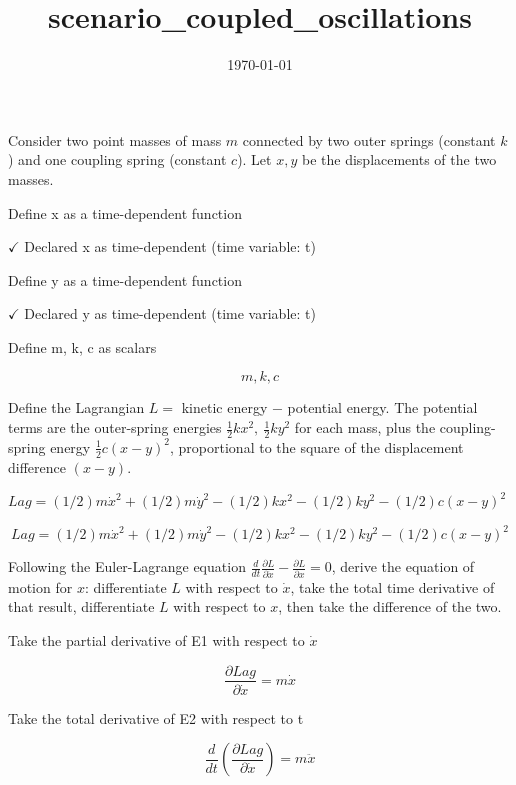 \documentclass[dvipdfmx]{article}
\title{scenario\_coupled\_oscillations}
\date{\today}
\begin{document}
\maketitle

Consider two point masses of mass $m$ connected by two outer springs (constant $k$) and one coupling spring (constant $c$). Let $x,y$ be the displacements of the two masses.

Define x as a time-dependent function

$\checkmark$ Declared x as time-dependent (time variable: t)

Define y as a time-dependent function

$\checkmark$ Declared y as time-dependent (time variable: t)

Define m, k, c as scalars

\[
  m, k, c
\]

Define the Lagrangian $L=$ kinetic energy $-$ potential energy. The potential terms are the outer-spring energies $\frac12kx^2,\ \frac12ky^2$ for each mass, plus the coupling-spring energy $\frac12c(x-y)^2$, proportional to the square of the displacement difference $(x-y)$.

$Lag = (1/2) m \dot{x}^2 + (1/2) m \dot{y}^2 - (1/2) k x^2 - (1/2) k y^2 - (1/2) c (x - y)^2$

\begin{equation}
  Lag = (1/2) m \dot{x}^2 + (1/2) m \dot{y}^2 - (1/2) k x^2 - (1/2) k y^2 - (1/2) c (x - y)^2
  \label{eq:E1}
\end{equation}

Following the Euler-Lagrange equation $\frac{d}{dt}\frac{\partial L}{\partial\dot x}-\frac{\partial L}{\partial x}=0$, derive the equation of motion for $x$: differentiate $L$ with respect to $\dot x$, take the total time derivative of that result, differentiate $L$ with respect to $x$, then take the difference of the two.

Take the partial derivative of E1 with respect to $\dot{x}$

\begin{equation}
  \frac{\partial Lag}{\partial \dot{x}} = m \dot{x}
  \label{eq:E2}
\end{equation}

Take the total derivative of E2 with respect to t

\begin{equation}
  \frac{d}{dt}\left(\frac{\partial Lag}{\partial \dot{x}}\right) = m \ddot{x}
  \label{eq:E3}
\end{equation}
\end{document}
